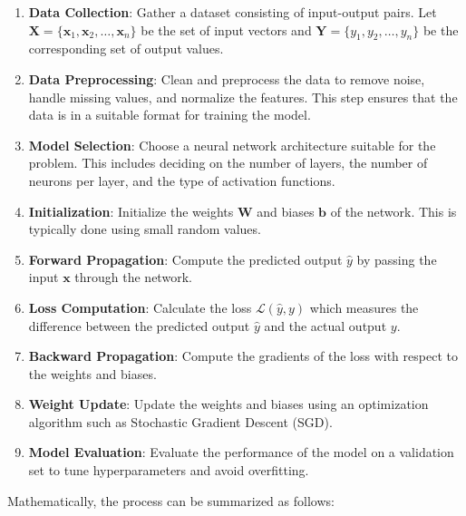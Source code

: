     \begin{enumerate}
        \item \textbf{Data Collection}: Gather a dataset consisting of input-output pairs. Let \( \mathbf{X} = \{ \mathbf{x}_1, \mathbf{x}_2, \ldots, \mathbf{x}_n \} \) be the set of input vectors and \( \mathbf{Y} = \{ y_1, y_2, \ldots, y_n \} \) be the corresponding set of output values.
        
        \item \textbf{Data Preprocessing}: Clean and preprocess the data to remove noise, handle missing values, and normalize the features. This step ensures that the data is in a suitable format for training the model.
        
        \item \textbf{Model Selection}: Choose a neural network architecture suitable for the problem. This includes deciding on the number of layers, the number of neurons per layer, and the type of activation functions.
        
        \item \textbf{Initialization}: Initialize the weights \( \mathbf{W} \) and biases \( \mathbf{b} \) of the network. This is typically done using small random values.
        
        \item \textbf{Forward Propagation}: Compute the predicted output \( \hat{y} \) by passing the input \( \mathbf{x} \) through the network.
        
        \item \textbf{Loss Computation}: Calculate the loss \( \mathcal{L}(\hat{y}, y) \) which measures the difference between the predicted output \( \hat{y} \) and the actual output \( y \).
        
        \item \textbf{Backward Propagation}: Compute the gradients of the loss with respect to the weights and biases.
        
        \item \textbf{Weight Update}: Update the weights and biases using an optimization algorithm such as Stochastic Gradient Descent (SGD).
        
        \item \textbf{Model Evaluation}: Evaluate the performance of the model on a validation set to tune hyperparameters and avoid overfitting.
    \end{enumerate}

    \noindent Mathematically, the process can be summarized as follows:

